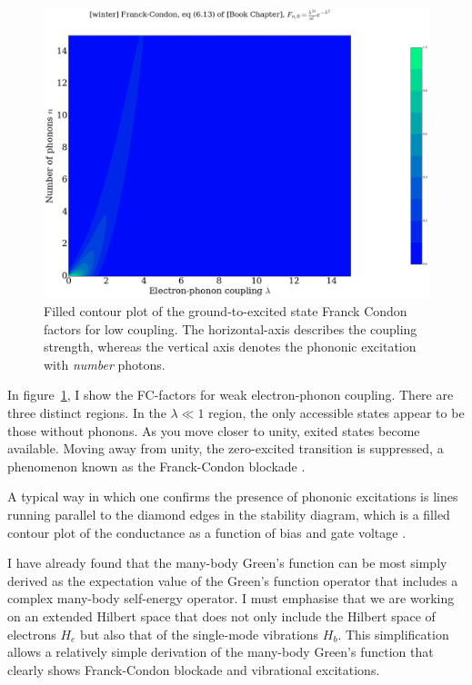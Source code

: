 \begin{figure}[!bp]
    \centering
    \includegraphics[height=.3\textheight]{png/fcfig.png}
    \caption{Filled contour plot of the ground-to-excited state Franck Condon factors for low coupling. The horizontal-axis describes the coupling strength, whereas the vertical axis denotes the phononic excitation with \emph{number} photons.}
    \label{fig:fc}
\end{figure}

In figure~\ref{fig:fc}, I show the FC-factors for weak electron-phonon coupling. There are three distinct regions. In the $\lambda\ll 1$ region, the only accessible states appear to be those without phonons. As you move closer to unity, exited states become available. Moving away from unity, the zero-excited transition is suppressed, a phenomenon known as the Franck-Condon blockade \cite{fcblockade}.

A typical way in which one confirms the presence of phononic excitations is lines running parallel to the diamond edges in the stability diagram, which is a filled contour plot of the conductance as a function of bias and gate voltage \cite{vibrationcomputation}.

I have already found that the many-body Green's function can be most simply derived as the expectation value of the Green's function operator that includes a complex many-body self-energy operator. I must emphasise that we are working on an extended Hilbert space that does not only include the Hilbert space of electrons $H_e$ but also that of the single-mode vibrations $H_b$. This simplification allows a relatively simple derivation of the many-body Green's function that clearly shows Franck-Condon blockade and vibrational excitations.  

